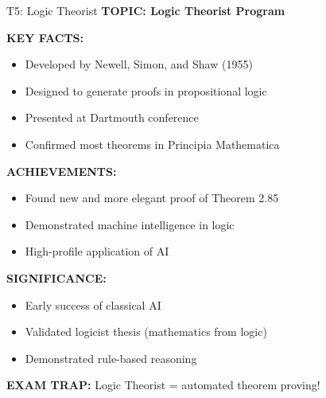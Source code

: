 \documentclass[8pt]{beamer}
\begin{document}
	\begin{frame}{T5: Logic Theorist}
		\fontsize{6.5}{7.5}\selectfont
		\textbf{TOPIC: Logic Theorist Program}
		
		\vspace{0.1cm}
		\textbf{KEY FACTS:}
		\begin{itemize}
			\item Developed by Newell, Simon, and Shaw (1955)
			\item Designed to generate proofs in propositional logic
			\item Presented at Dartmouth conference
			\item Confirmed most theorems in Principia Mathematica
		\end{itemize}
		
		\vspace{0.1cm}
		\textbf{ACHIEVEMENTS:}
		\begin{itemize}
			\item Found new and more elegant proof of Theorem 2.85
			\item Demonstrated machine intelligence in logic
			\item High-profile application of AI
		\end{itemize}
		
		\vspace{0.1cm}
		\textbf{SIGNIFICANCE:}
		\begin{itemize}
			\item Early success of classical AI
			\item Validated logicist thesis (mathematics from logic)
			\item Demonstrated rule-based reasoning
		\end{itemize}
		
		\textcolor{myred}{\textbf{EXAM TRAP:}} Logic Theorist = \textcolor{myblue}{automated theorem proving}!
	\end{frame}
	
\end{document}
